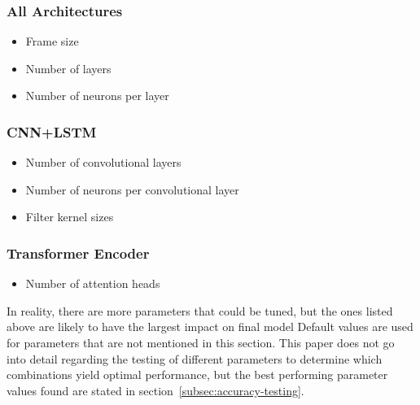 \subsubsection{All Architectures}
\begin{itemize}
    \item Frame size
    \item Number of layers
    \item Number of neurons per layer
\end{itemize}

\subsubsection{CNN+LSTM}
\begin{itemize}
    \item Number of convolutional layers
    \item Number of neurons per convolutional layer
    \item Filter kernel sizes
\end{itemize}

\subsubsection{Transformer Encoder}
\begin{itemize}
    \item Number of attention heads
\end{itemize}

In reality, there are more parameters that could be tuned, but the ones listed above are likely to have the largest impact on final model
Default values are used for parameters that are not mentioned in this section.
This paper does not go into detail regarding the testing of different parameters to determine which combinations yield optimal performance, but the best performing parameter values found are stated in section~\ref{subsec:accuracy-testing}.
